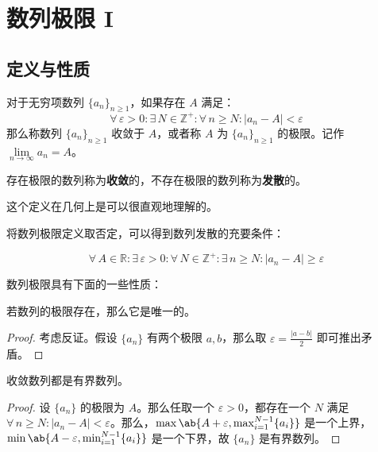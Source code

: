 \section{数列极限 I}

\subsection{定义与性质}

\begin{definition}[数列极限的定义]
	对于无穷项数列 $\{a_n\}_{n \ge 1}$，如果存在 $A$ 满足：
	$$
	\forall\,\varepsilon > 0: \exists\,N \in \mathbb{Z}^+: \forall\,n \ge N: |a_n - A| < \varepsilon
	$$
	那么称数列 $\{a_n\}_{n \ge 1}$ 收敛于 $A$，或者称 $A$ 为 $\{a_n\}_{n \ge 1}$ 的极限。记作 $\lim\limits_{n \to \infty} a_n = A$。

	存在极限的数列称为\textbf{收敛}的，不存在极限的数列称为\textbf{发散}的。
\end{definition}

这个定义在几何上是可以很直观地理解的。

将数列极限定义取否定，可以得到数列发散的充要条件：

$$
\forall\,A \in \mathbb{R}: \exists\,\varepsilon > 0: \forall\,N \in \mathbb{Z}^+: \exists\,n \ge N: |a_n - A| \ge \varepsilon
$$

数列极限具有下面的一些性质：

\begin{property}[唯一性]
	若数列的极限存在，那么它是唯一的。

	\begin{proof}
		考虑反证。假设 $\{a_n\}$ 有两个极限 $a,b$，那么取 $\varepsilon = \frac{|a-b|}{2}$ 即可推出矛盾。
	\end{proof}
\end{property}

\begin{property}[有界性]
	收敛数列都是有界数列。

	\begin{proof}
		设 $\{a_n\}$ 的极限为 $A$。那么任取一个 $\varepsilon > 0$，都存在一个 $N$ 满足 $\forall\,n \ge N: |a_n - A| < \varepsilon$。那么，$\max\ab\{A + \varepsilon, \max_{i=1}^{N-1}\{a_i\}\}$ 是一个上界，$\min\ab\{A - \varepsilon, \min_{i=1}^{N-1}\{a_i\}\}$ 是一个下界，故 $\{a_n\}$ 是有界数列。
	\end{proof}
\end{property}

